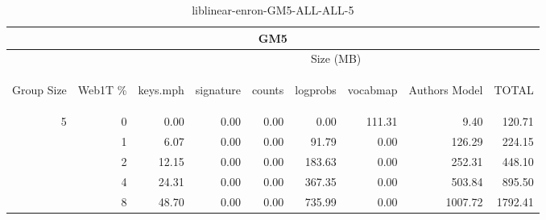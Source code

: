 \begin{center}
\begin{table}[htbp]
\begin{tabular}{ | r | r | r | r | r | r | r | r | r |}
\hline
\multicolumn{9}{|c|}{GM5}\\
\hline
 & & \multicolumn{7}{|c|}{Size (MB)}\\ \cline{3-9}
\begin{sideways}Group Size\end{sideways} & \begin{sideways}Web1T \% \end{sideways} & \begin{sideways}keys.mph\end{sideways} & \begin{sideways}signature\end{sideways} & \begin{sideways}counts\end{sideways} & \begin{sideways}logprobs\end{sideways} & \begin{sideways}vocabmap\end{sideways} & \begin{sideways}Authors Model \end{sideways} & \begin{sideways}TOTAL\end{sideways}\\
\hline
\multirow{4}{*}{5}
 & 0 & 0.00 & 0.00 & 0.00 & 0.00 & 111.31 & 9.40 & 120.71\\ \cline{2-9}
 & 1 & 6.07 & 0.00 & 0.00 & 91.79 & 0.00 & 126.29 & 224.15\\ \cline{2-9}
 & 2 & 12.15 & 0.00 & 0.00 & 183.63 & 0.00 & 252.31 & 448.10\\ \cline{2-9}
 & 4 & 24.31 & 0.00 & 0.00 & 367.35 & 0.00 & 503.84 & 895.50\\ \cline{2-9}
 & 8 & 48.70 & 0.00 & 0.00 & 735.99 & 0.00 & 1007.72 & 1792.41\\ \cline{2-9}
\hline
\end{tabular}
\caption{liblinear-enron-GM5-ALL-ALL-5}
\label{table:liblinear-enron-GM5-ALL-ALL-5}
\end{table}
\end{center}

